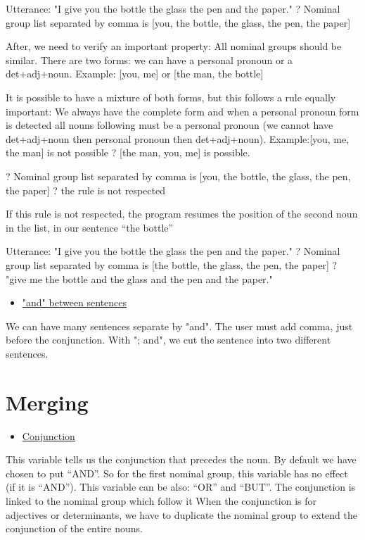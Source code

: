 \documentclass[twoside,a4paper,10pt]{report}
\newcommand{\dokutitleleveltree}[1]{\section{#1}}
\newcommand{\dokuunderline}[1]{\underline{#1}}
\newcommand{\dokuitem}{\item}
\begin{document}
\small
\begin{verbatimtab}
  Utterance: "I give you the bottle the glass the pen and the paper." 
  ? Nominal group list separated by comma is [you, the bottle, the glass, the pen, the paper]
\end{verbatimtab}
\normalsize
After, we need to verify an important property: All nominal groups should be similar. There are two forms: we can have a personal pronoun or a det+adj+noun. Example: [you, me] or [the man, the bottle] 

It is possible to have a mixture of both forms, but this follows a rule equally important: We always have the complete form and when a personal pronoun form is detected all nouns following must be a personal pronoun (we cannot have det+adj+noun then personal pronoun then det+adj+noun). Example:[you, me, the man] is not possible ? [the man, you, me] is possible.


\small
\begin{verbatimtab}
  ? Nominal group list separated by comma is [you, the bottle, the glass, the pen, the paper] 
  ? the rule is not respected
\end{verbatimtab}
\normalsize

If this rule is not respected, the program resumes the position of the second noun in the list, in our sentence “the bottle”


\small
\begin{verbatimtab}
  Utterance: "I give you the bottle the glass the pen and the paper." 
  ? Nominal group list separated by comma is [the bottle, the glass, the pen, the paper]
  ? "give me the bottle and the glass and the pen and the paper."
\end{verbatimtab}
\normalsize

\begin{itemize}
\dokuitem  \dokuunderline{"and" between sentences}
\end{itemize}
We can have many sentences separate by "and". The user must add comma, just before the conjunction. With "; and", we cut the sentence into two different sentences.


\dokutitleleveltree{Merging}
\label{65cc30ed55db36c739ab349d7c58dfe8}%

\begin{itemize}
\dokuitem  \dokuunderline{Conjunction}
\end{itemize}
This variable tells us the conjunction that precedes the noun. By default we have chosen to put “AND”. So for the first nominal group, this variable has no effect (if it is “AND”). This variable can be also: “OR” and “BUT”. The conjunction is linked to the nominal group which follow it
When the conjunction is for adjectives or determinants, we have to duplicate the nominal group to extend the conjunction of the entire nouns.
\end{document}

